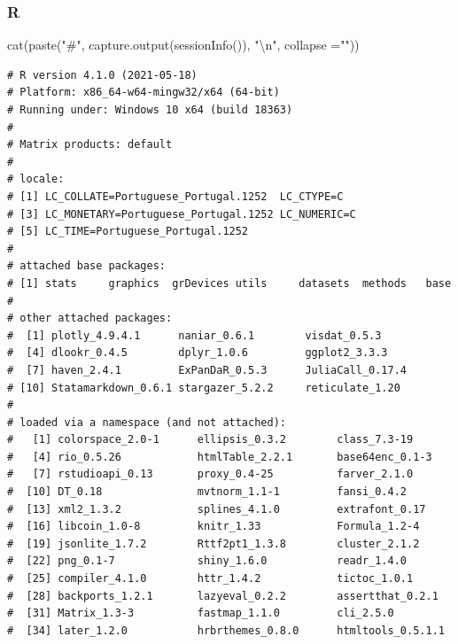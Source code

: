 \documentclass[
  12pt,
]{article}
\newenvironment{Shaded}{\begin{snugshade}}{\end{snugshade}}
\newcommand{\AttributeTok}[1]{\textcolor[rgb]{0.77,0.63,0.00}{#1}}
\newcommand{\FunctionTok}[1]{\textcolor[rgb]{0.00,0.00,0.00}{#1}}
\newcommand{\NormalTok}[1]{#1}
\newcommand{\SpecialCharTok}[1]{\textcolor[rgb]{0.00,0.00,0.00}{#1}}
\newcommand{\StringTok}[1]{\textcolor[rgb]{0.31,0.60,0.02}{#1}}
\begin{document}
\hypertarget{r-1}{%
\subsubsection{R}\label{r-1}}

\begin{Shaded}
\begin{Highlighting}[]
\FunctionTok{cat}\NormalTok{(}\FunctionTok{paste}\NormalTok{(}\StringTok{"\#"}\NormalTok{, }\FunctionTok{capture.output}\NormalTok{(}\FunctionTok{sessionInfo}\NormalTok{()), }\StringTok{"}\SpecialCharTok{\textbackslash{}n}\StringTok{"}\NormalTok{, }\AttributeTok{collapse =}\StringTok{""}\NormalTok{))}
\end{Highlighting}
\end{Shaded}

\begin{verbatim}
# R version 4.1.0 (2021-05-18) 
# Platform: x86_64-w64-mingw32/x64 (64-bit) 
# Running under: Windows 10 x64 (build 18363) 
#  
# Matrix products: default 
#  
# locale: 
# [1] LC_COLLATE=Portuguese_Portugal.1252  LC_CTYPE=C                           
# [3] LC_MONETARY=Portuguese_Portugal.1252 LC_NUMERIC=C                         
# [5] LC_TIME=Portuguese_Portugal.1252     
#  
# attached base packages: 
# [1] stats     graphics  grDevices utils     datasets  methods   base      
#  
# other attached packages: 
#  [1] plotly_4.9.4.1      naniar_0.6.1        visdat_0.5.3        
#  [4] dlookr_0.4.5        dplyr_1.0.6         ggplot2_3.3.3       
#  [7] haven_2.4.1         ExPanDaR_0.5.3      JuliaCall_0.17.4    
# [10] Statamarkdown_0.6.1 stargazer_5.2.2     reticulate_1.20     
#  
# loaded via a namespace (and not attached): 
#   [1] colorspace_2.0-1      ellipsis_0.3.2        class_7.3-19          
#   [4] rio_0.5.26            htmlTable_2.2.1       base64enc_0.1-3       
#   [7] rstudioapi_0.13       proxy_0.4-25          farver_2.1.0          
#  [10] DT_0.18               mvtnorm_1.1-1         fansi_0.4.2           
#  [13] xml2_1.3.2            splines_4.1.0         extrafont_0.17        
#  [16] libcoin_1.0-8         knitr_1.33            Formula_1.2-4         
#  [19] jsonlite_1.7.2        Rttf2pt1_1.3.8        cluster_2.1.2         
#  [22] png_0.1-7             shiny_1.6.0           readr_1.4.0           
#  [25] compiler_4.1.0        httr_1.4.2            tictoc_1.0.1          
#  [28] backports_1.2.1       lazyeval_0.2.2        assertthat_0.2.1      
#  [31] Matrix_1.3-3          fastmap_1.1.0         cli_2.5.0             
#  [34] later_1.2.0           hrbrthemes_0.8.0      htmltools_0.5.1.1     

\end{verbatim}
\end{document}
